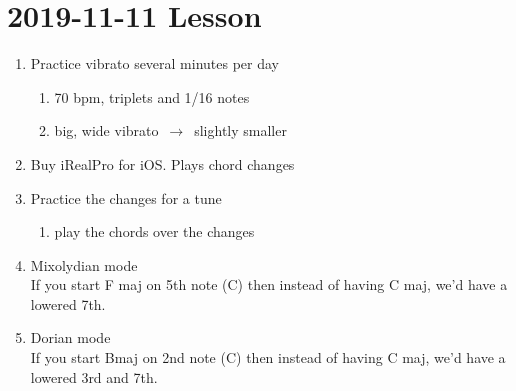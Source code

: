 \section{2019-11-11 Lesson}
\label{sec:19_11_11_lesson}


\begin{enumerate}
\item Practice vibrato several minutes per day
  \begin{enumerate}
  \item 70 bpm, triplets and 1/16 notes
  \item big, wide vibrato $\,\to\,$ slightly smaller
  \end{enumerate}
\item Buy iRealPro for iOS. Plays chord changes
\item Practice the changes for a tune
  \begin{enumerate}
  \item play the chords over the changes

  \end{enumerate}
\item Mixolydian mode \\
  If you start F maj on 5th note (C) then instead of having C maj, we'd have a lowered 7th.


\item Dorian mode \\
  If you start B\mflat maj on 2nd note (C) then instead of having C maj, we'd have a lowered 3rd and 7th.

  \begin{lilypond}[staffsize=23]
    
    


\end{lilypond}
\end{enumerate}
